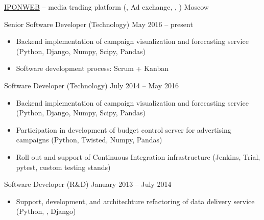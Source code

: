 \documentclass[unicode, 10pt, a4paper, oneside, fleqn]{article}
\begin{document}
\job  %
    {\href{http://www.iponweb.com}{IPONWEB} -- media trading platform
     (, Ad exchange, , )}
    {Moscow}
    {
        \position  %
            {Senior Software Developer (Technology)}
            {May 2016 -- present}
            {
                \begin{itemize}
                    \item{Backend implementation of campaign visualization and
                          forecasting service (Python, Django, Numpy, Scipy, Pandas)}
                    \item{Software development process: Scrum + Kanban}
                \end{itemize}
            }
        \position  %
            {Software Developer (Technology)}
            {July 2014 -- May 2016}
            {
                \begin{itemize}
                    \item{Backend implementation of campaign visualization and
                          forecasting service (Python, Django, Numpy, Scipy, Pandas)}
                    \item{Participation in development of budget control server for
                          advertising campaigns (Python, Twisted, Numpy, Pandas)}
                    \item{Roll out and support of Continuous Integration infrastructure
                          (Jenkins, Trial, pytest, custom testing stands)}
                \end{itemize}
            }
        \position  %
            {Software Developer (R\&D)}
            {January 2013 -- July 2014}
            {
                \begin{itemize}
                    \item{Support, development, and architechture refactoring
                          of data delivery service (Python, , Django)}
                \end{itemize}
            }
    }
\end{document}
